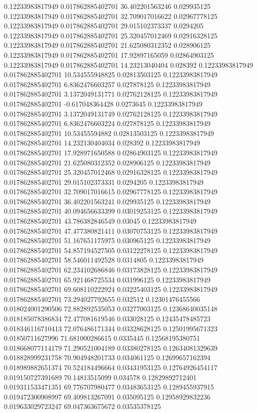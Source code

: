 0.12233983817949 0.017862885402701 36.402201563246 0.029935125
0.12233983817949 0.017862885402701 32.709017016622 0.02967778125
0.12233983817949 0.017862885402701 29.015102373337 0.0294205
0.12233983817949 0.017862885402701 25.320457012469 0.02916328125
0.12233983817949 0.017862885402701 21.625080312352 0.028906125
0.12233983817949 0.017862885402701 17.92897165059 0.02864903125
0.12233983817949 0.017862885402701 14.23213040404 0.028392
0.12233983817949 0.017862885402701 10.534555948825 0.02813503125
0.12233983817949 0.017862885402701 6.8362476603257 0.027878125
0.12233983817949 0.017862885402701 3.1372049131771 0.02762128125
0.12233983817949 0.017862885402701 -0.617048364428 0.0273645
0.12233983817949 0.017862885402701 3.1372049131749 0.02762128125
0.12233983817949 0.017862885402701 6.8362476603224 0.027878125
0.12233983817949 0.017862885402701 10.53455594882 0.02813503125
0.12233983817949 0.017862885402701 14.232130404034 0.028392
0.12233983817949 0.017862885402701 17.928971650588 0.02864903125
0.12233983817949 0.017862885402701 21.625080312352 0.028906125
0.12233983817949 0.017862885402701 25.320457012468 0.02916328125
0.12233983817949 0.017862885402701 29.015102373331 0.0294205
0.12233983817949 0.017862885402701 32.709017016615 0.02967778125
0.12233983817949 0.017862885402701 36.402201563241 0.029935125
0.12233983817949 0.017862885402701 40.094656633399 0.03019253125
0.12233983817949 0.017862885402701 43.786382846549 0.03045
0.12233983817949 0.017862885402701 47.477380821411 0.03070753125
0.12233983817949 0.017862885402701 51.167651175975 0.030965125
0.12233983817949 0.017862885402701 54.857194527505 0.03122278125
0.12233983817949 0.017862885402701 58.546011492528 0.0314805
0.12233983817949 0.017862885402701 62.234102686846 0.03173828125
0.12233983817949 0.017862885402701 65.921468725534 0.031996125
0.12233983817949 0.017862885402701 69.608110222924 0.03225403125
0.12233983817949 0.017862885402701 73.294027792655 0.032512
0.12301476455566 0.018024001290506 72.882892535053 0.03277003125
0.12368640035148 0.018185078386834 72.477081619546 0.033028125
0.12435478485723 0.018346116710413 72.076486171344 0.03328628125
0.12501995671323 0.01850711627996 71.681000286615 0.0335445
0.12568195380751 0.018668077114179 71.290521004189 0.03380278125
0.12634081329639 0.018828999231758 70.904948201733 0.034061125
0.12699657162394 0.018989882651374 70.524184496664 0.03431953125
0.12764926454117 0.019150727391689 70.14813515099 0.034578
0.12829892712401 0.019311533471351 69.776707980477 0.03483653125
0.1289455937915 0.019472300908997 69.409813267091 0.035095125
0.12958929832236 0.019633029723247 69.047363675672 0.03535378125

